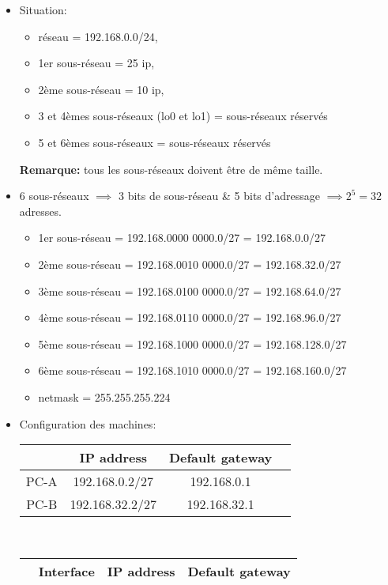 \documentclass[a4paper]{article}
\begin{document}
\begin{itemize}





\item Situation:
\begin{itemize}
    \item réseau = 192.168.0.0/24,
    \item 1er sous-réseau = 25 ip,
    \item 2ème sous-réseau = 10 ip,
    \item 3 et 4èmes sous-réseaux (lo0 et lo1) = sous-réseaux réservés
    \item 5 et 6èmes sous-réseaux = sous-réseaux réservés
\end{itemize}
\textbf{Remarque:} tous les sous-réseaux doivent être de même taille.





\item 6 sous-réseaux $ \implies $ 3 bits de sous-réseau \& 5 bits d'adressage $ \implies 2^5 = 32 $ adresses.
\begin{itemize}
    \item 1er sous-réseau = 192.168.0000 0000.0/27 = 192.168.0.0/27
    \item 2ème sous-réseau = 192.168.0010 0000.0/27 = 192.168.32.0/27
    \item 3ème sous-réseau = 192.168.0100 0000.0/27 = 192.168.64.0/27
    \item 4ème sous-réseau = 192.168.0110 0000.0/27 = 192.168.96.0/27
    \item 5ème sous-réseau = 192.168.1000 0000.0/27 = 192.168.128.0/27
    \item 6ème sous-réseau = 192.168.1010 0000.0/27 = 192.168.160.0/27
    \item netmask = 255.255.255.224
\end{itemize}





\item Configuration des machines:
\begin{center}
    \begin{tabular}{|c|c|c|c|} \hline
        & IP address & Default gateway \\ \hline
        PC-A & 192.168.0.2/27 & 192.168.0.1 \\ \hline
        PC-B & 192.168.32.2/27 & 192.168.32.1 \\ \hline
    \end{tabular}
    \\
    \begin{tabular}{|c|c|c|c|} \hline
        & Interface & IP address & Default gateway \\ \hline


\end{tabular}
\end{center}
\end{itemize}
\end{document}
